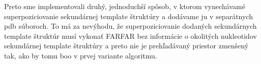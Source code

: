 \indent Preto sme implementovali druhý, jednoduchší spôsob, v ktorom vynechávamé superpoziciovanie sekundárnej template štruktúry a dodávame ju v separátnych pdb súboroch. To má za nevýhodu, že superpoziciovanie dodaných sekundárnych template štruktúr musí vykonať FARFAR bez informácie o okolitých nukleotidov sekundárnej template štruktúry a preto nie je prehľadávaný priestor zmenšený tak, ako by tomu boo v prvej variante algoritmu.

